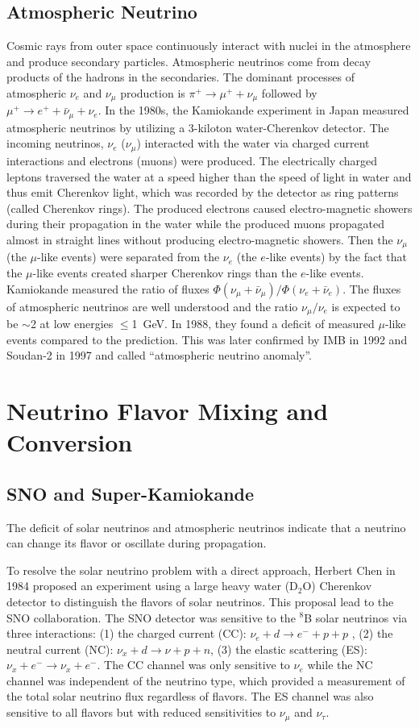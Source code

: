 \documentclass[preprint,12pt]{elsarticle}
\numberwithin{equation}{section}
\begin{document}
\subsection{Atmospheric Neutrino}
Cosmic rays from outer space continuously interact with nuclei in the atmosphere and produce secondary particles. Atmospheric neutrinos come from decay products of the hadrons in the secondaries. The dominant processes of atmospheric $\nu_e$ and $\nu_\mu$ production is $\pi^+\to\mu^+ + \nu_\mu$ followed by $\mu^+ \to e^+ + \bar{\nu}_\mu + \nu_e$. In the 1980s, the Kamiokande experiment in Japan measured atmospheric neutrinos by utilizing a 3-kiloton water-Cherenkov detector. The incoming neutrinos, $\nu_e$ ($\nu_\mu$) interacted with the water via charged current interactions and electrons (muons) were produced. The electrically charged leptons traversed the water at a speed higher than the speed of light in water and thus emit Cherenkov light, which was recorded by the detector as ring patterns (called Cherenkov rings). The produced electrons caused electro-magnetic showers during their propagation in the water while the produced muons propagated almost in straight lines without producing electro-magnetic showers. Then the $\nu_\mu$ (the $\mu$-like events) were separated from the $\nu_e$ (the $e$-like events) by the fact that the $\mu$-like events created sharper Cherenkov rings than the $e$-like events. Kamiokande measured the ratio of fluxes $\Phi(\nu_\mu+\bar{\nu}_\mu)/\Phi(\nu_e+\bar{\nu}_e)$. The fluxes of atmospheric neutrinos are well understood and the ratio $\nu_\mu/\nu_e$ is expected to be $\sim$2 at low energies $\leq$1~GeV. In 1988, they found a deficit of measured $\mu$-like events compared to the prediction. This was later confirmed by IMB in 1992\cite{imb} and Soudan-2 in 1997\cite{soudan2} and called ``atmospheric neutrino anomaly''\cite{atmNuReview}.

\section{Neutrino Flavor Mixing and Conversion}
\subsection{SNO and Super-Kamiokande}
The deficit of solar neutrinos and atmospheric neutrinos indicate that a neutrino can change its flavor or oscillate during propagation.

To resolve the solar neutrino problem with a direct approach, Herbert Chen in 1984 proposed an experiment using a large heavy water (D$_2$O) Cherenkov detector to distinguish the flavors of solar neutrinos\cite{herbertChen}. This proposal lead to the SNO collaboration. The SNO detector was sensitive to the $^8$B solar neutrinos via three interactions: (1) the charged current (CC): $\nu_e+d\to e^-+p+p$ , (2) the neutral current (NC): $\nu_x+d\to\nu+p+n$, (3) the elastic scattering (ES): $\nu_x+e^-\to \nu_x+e^-$. The CC channel was only sensitive to $\nu_e$ while the NC channel was independent of the neutrino type, which provided a measurement of the total solar neutrino flux regardless of flavors. The ES channel was also sensitive to all flavors but with reduced sensitivities to $\nu_\mu$ and $\nu_\tau$\cite{SNO}.
\end{document}
